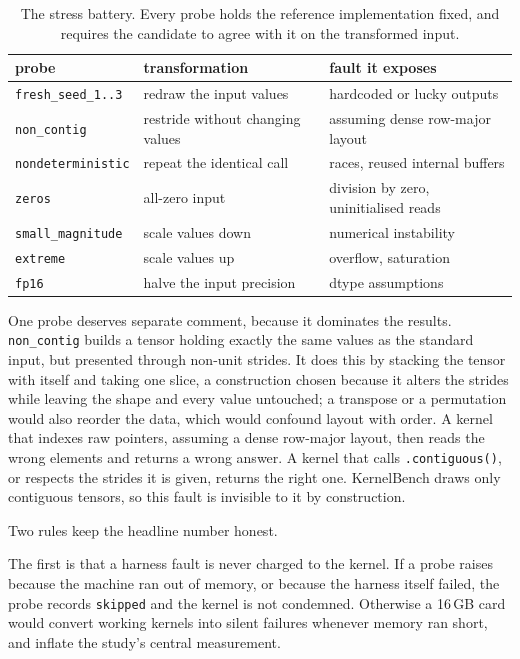 \documentclass[12pt]{article}
\begin{document}
\begin{table}[h]
\centering
\begin{tabular}{lll}
\toprule
probe & transformation & fault it exposes \\
\midrule
\texttt{fresh\_seed\_1..3}  & redraw the input values          & hardcoded or lucky outputs \\
\texttt{non\_contig}        & restride without changing values & assuming dense row-major layout \\
\texttt{nondeterministic}   & repeat the identical call        & races, reused internal buffers \\
\texttt{zeros}              & all-zero input                   & division by zero, uninitialised reads \\
\texttt{small\_magnitude}   & scale values down                & numerical instability \\
\texttt{extreme}            & scale values up                  & overflow, saturation \\
\texttt{fp16}               & halve the input precision        & dtype assumptions \\
\bottomrule
\end{tabular}
\caption{The stress battery. Every probe holds the reference implementation
fixed, and requires the candidate to agree with it on the transformed input.}
\label{tab:probes}
\end{table}

One probe deserves separate comment, because it dominates the results.
\texttt{non\_contig} builds a tensor holding exactly the same values as the
standard input, but presented through non-unit strides. It does this by
stacking the tensor with itself and taking one slice, a construction chosen
because it alters the strides while leaving the shape and every value
untouched; a transpose or a permutation would also reorder the data, which
would confound layout with order. A kernel that indexes raw
pointers, assuming a dense row-major layout, then reads the wrong elements and
returns a wrong answer. A kernel that calls \texttt{.contiguous()}, or respects
the strides it is given, returns the right one. KernelBench draws only
contiguous tensors, so this fault is invisible to it by construction.

Two rules keep the headline number honest.

The first is that a harness fault is never charged to the kernel. If a probe
raises because the machine ran out of memory, or because the harness itself
failed, the probe records \texttt{skipped} and the kernel is not condemned.
Otherwise a 16\,GB card would convert working kernels into silent failures
whenever memory ran short, and inflate the study's central measurement.
\end{document}
